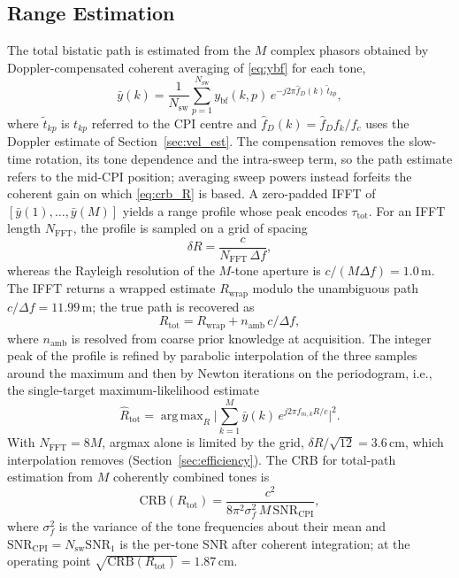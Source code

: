 \documentclass[journal]{IEEEtran}
\DeclareMathOperator*{\argmax}{arg\,max}
\begin{document}
\subsection{Range Estimation}
\label{sec:range_est}
The total bistatic path is estimated from the $M$ complex phasors obtained by Doppler-compensated coherent averaging of \eqref{eq:ybf} for each tone,
\begin{equation}
\bar{y}(k) = \frac{1}{N_{\mathrm{sw}}}
\sum_{p=1}^{N_{\mathrm{sw}}} y_{\mathrm{bf}}(k,p)\,e^{-j2\pi \hat f_D(k)\,\tilde t_{kp}},
\label{eq:ybar}
\end{equation}
where $\tilde t_{kp}$ is $t_{kp}$ referred to the CPI centre and $\hat f_D(k) = \hat f_D f_k/f_c$ uses the Doppler estimate of Section~\ref{sec:vel_est}. The compensation removes the slow-time rotation, its tone dependence and the intra-sweep term, so the path estimate refers to the mid-CPI position; averaging sweep powers instead forfeits the coherent gain on which \eqref{eq:crb_R} is based.
A zero-padded IFFT of $[\bar{y}(1),\dots,\bar{y}(M)]$ yields a range profile
whose peak encodes $\tau_{\mathrm{tot}}$. For an IFFT length $N_{\mathrm{FFT}}$, the profile is sampled on a grid of spacing~\cite{richards2005fundamentals,rohling2001waveform}
\begin{equation}
\delta R = \frac{c}{N_{\mathrm{FFT}}\,\Delta f},
\label{eq:dR}
\end{equation}
whereas the Rayleigh resolution of the $M$-tone aperture is $c/(M\Delta f) = 1.0$\,m. The IFFT returns a wrapped estimate $R_{\mathrm{wrap}}$ modulo the unambiguous path $c/\Delta f = 11.99$\,m; the true path is recovered as
\begin{equation}
R_{\mathrm{tot}} = R_{\mathrm{wrap}} + n_{\mathrm{amb}}\,c/\Delta f,
\label{eq:Rtot}
\end{equation}
where $n_{\mathrm{amb}}$ is resolved from coarse prior knowledge at acquisition. The integer peak of the profile is refined by parabolic interpolation of the three samples around the maximum and then by Newton iterations on the periodogram, i.e., the single-target maximum-likelihood estimate
\begin{equation}
\hat R_{\mathrm{tot}} = \argmax_R \Big|\sum_{k=1}^{M} \bar y(k)\,e^{j2\pi f_{m,k}R/c}\Big|^2.
\label{eq:R_ml}
\end{equation}
With $N_{\mathrm{FFT}}=8M$, argmax alone is limited by the grid, $\delta R/\sqrt{12} = 3.6$\,cm, which interpolation removes (Section~\ref{sec:efficiency}).
 The CRB for total-path estimation from $M$ coherently combined
tones is~\cite{rohling2001waveform}
\begin{equation}
\mathrm{CRB}(R_{\mathrm{tot}}) =
\frac{c^2}{8\pi^2 \sigma_f^2\, M\, \mathrm{SNR}_{\mathrm{CPI}}},
\label{eq:crb_R}
\end{equation}
where $\sigma_f^2$ is the variance of the tone frequencies about their mean and $\mathrm{SNR}_{\mathrm{CPI}} = N_{\mathrm{sw}}\mathrm{SNR}_1$ is the per-tone SNR after coherent integration; at the operating point $\sqrt{\mathrm{CRB}(R_{\mathrm{tot}})} = 1.87$\,cm.
\end{document}
